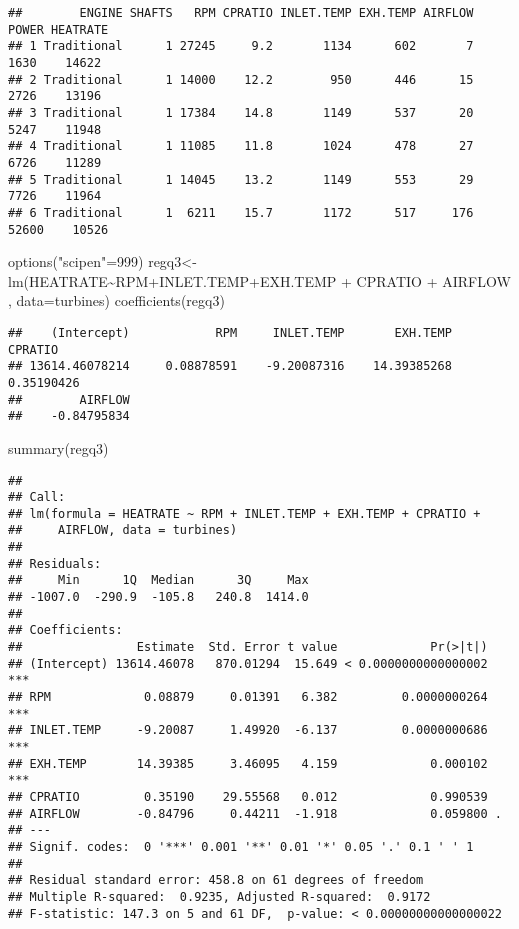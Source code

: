 \documentclass[
]{article}
\newenvironment{Shaded}{\begin{snugshade}}{\end{snugshade}}
\newcommand{\AttributeTok}[1]{\textcolor[rgb]{0.77,0.63,0.00}{#1}}
\newcommand{\DecValTok}[1]{\textcolor[rgb]{0.00,0.00,0.81}{#1}}
\newcommand{\FunctionTok}[1]{\textcolor[rgb]{0.00,0.00,0.00}{#1}}
\newcommand{\NormalTok}[1]{#1}
\newcommand{\OtherTok}[1]{\textcolor[rgb]{0.56,0.35,0.01}{#1}}
\newcommand{\SpecialCharTok}[1]{\textcolor[rgb]{0.00,0.00,0.00}{#1}}
\newcommand{\StringTok}[1]{\textcolor[rgb]{0.31,0.60,0.02}{#1}}
\begin{document}
\begin{verbatim}
##        ENGINE SHAFTS   RPM CPRATIO INLET.TEMP EXH.TEMP AIRFLOW POWER HEATRATE
## 1 Traditional      1 27245     9.2       1134      602       7  1630    14622
## 2 Traditional      1 14000    12.2        950      446      15  2726    13196
## 3 Traditional      1 17384    14.8       1149      537      20  5247    11948
## 4 Traditional      1 11085    11.8       1024      478      27  6726    11289
## 5 Traditional      1 14045    13.2       1149      553      29  7726    11964
## 6 Traditional      1  6211    15.7       1172      517     176 52600    10526
\end{verbatim}

\begin{Shaded}
\begin{Highlighting}[]
\FunctionTok{options}\NormalTok{(}\StringTok{"scipen"}\OtherTok{=}\DecValTok{999}\NormalTok{)}
\NormalTok{regq3}\OtherTok{\textless{}{-}}\FunctionTok{lm}\NormalTok{(HEATRATE}\SpecialCharTok{\textasciitilde{}}\NormalTok{RPM}\SpecialCharTok{+}\NormalTok{INLET.TEMP}\SpecialCharTok{+}\NormalTok{EXH.TEMP }\SpecialCharTok{+}\NormalTok{ CPRATIO }\SpecialCharTok{+}\NormalTok{ AIRFLOW , }\AttributeTok{data=}\NormalTok{turbines)}
\FunctionTok{coefficients}\NormalTok{(regq3)}
\end{Highlighting}
\end{Shaded}

\begin{verbatim}
##    (Intercept)            RPM     INLET.TEMP       EXH.TEMP        CPRATIO 
## 13614.46078214     0.08878591    -9.20087316    14.39385268     0.35190426 
##        AIRFLOW 
##    -0.84795834
\end{verbatim}

\begin{Shaded}
\begin{Highlighting}[]
\FunctionTok{summary}\NormalTok{(regq3)}
\end{Highlighting}
\end{Shaded}

\begin{verbatim}
## 
## Call:
## lm(formula = HEATRATE ~ RPM + INLET.TEMP + EXH.TEMP + CPRATIO + 
##     AIRFLOW, data = turbines)
## 
## Residuals:
##     Min      1Q  Median      3Q     Max 
## -1007.0  -290.9  -105.8   240.8  1414.0 
## 
## Coefficients:
##                Estimate  Std. Error t value             Pr(>|t|)    
## (Intercept) 13614.46078   870.01294  15.649 < 0.0000000000000002 ***
## RPM             0.08879     0.01391   6.382         0.0000000264 ***
## INLET.TEMP     -9.20087     1.49920  -6.137         0.0000000686 ***
## EXH.TEMP       14.39385     3.46095   4.159             0.000102 ***
## CPRATIO         0.35190    29.55568   0.012             0.990539    
## AIRFLOW        -0.84796     0.44211  -1.918             0.059800 .  
## ---
## Signif. codes:  0 '***' 0.001 '**' 0.01 '*' 0.05 '.' 0.1 ' ' 1
## 
## Residual standard error: 458.8 on 61 degrees of freedom
## Multiple R-squared:  0.9235, Adjusted R-squared:  0.9172 
## F-statistic: 147.3 on 5 and 61 DF,  p-value: < 0.00000000000000022
\end{verbatim}
\end{document}
